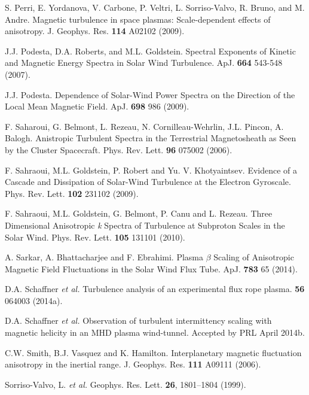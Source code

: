\documentclass[preprint2]{aastex}
\begin{document}
\begin{thebibliography}{}
 S. Perri, E. Yordanova, V. Carbone, P. Veltri, L. Sorriso-Valvo, R. Bruno, and M. Andre. Magnetic turbulence in space plasmas: Scale-dependent effects of anisotropy. J. Geophys. Res. {\bf 114} A02102 (2009).

 J.J. Podesta, D.A. Roberts, and M.L. Goldstein. Spectral Exponents of Kinetic and Magnetic Energy Spectra in Solar Wind Turbulence. ApJ. {\bf 664} 543-548 (2007).

 J.J. Podesta. Dependence of Solar-Wind Power Spectra on the Direction of the Local Mean Magnetic Field. ApJ. {\bf 698} 986 (2009).

 F. Saharoui, G. Belmont, L. Rezeau, N. Cornilleau-Wehrlin, J.L. Pincon, A. Balogh. Anistropic Turbulent Spectra in the Terrestrial Magnetosheath as Seen by the Cluster Spacecraft. Phys. Rev. Lett. {\bf 96} 075002 (2006).

 F. Sahraoui, M.L. Goldstein, P. Robert and Yu. V. Khotyaintsev. Evidence of a Cascade and Dissipation of Solar-Wind Turbulence at the Electron Gyroscale. Phys. Rev. Lett. {\bf 102} 231102 (2009).

 F. Sahraoui, M.L. Goldstein, G. Belmont, P. Canu and L. Rezeau. Three Dimensional Anisotropic {\it k} Spectra of Turbulence at Subproton Scales in the Solar Wind. Phys. Rev. Lett. {\bf 105} 131101 (2010).

A. Sarkar, A. Bhattacharjee and F. Ebrahimi. Plasma $\beta$ Scaling of Anisotropic Magnetic Field Fluctuations in the Solar Wind Flux Tube. ApJ. {\bf 783} 65 (2014).

 D.A. Schaffner {\it et al.} Turbulence analysis of an experimental flux rope plasma. {\bf 56} 064003 (2014a).

 D.A. Schaffner {\it et al.} Observation of turbulent intermittency scaling with magnetic helicity in an MHD plasma wind-tunnel. Accepted by PRL April 2014b.

 C.W. Smith, B.J. Vasquez and K. Hamilton. Interplanetary magnetic fluctuation anisotropy in the inertial range. J. Geophys. Res. {\bf 111} A09111 (2006).

Sorriso-Valvo, L. {\it et al.} Geophys. Res. Lett. {\bf 26}, 1801–1804 (1999).


\end{thebibliography}
\end{document}
